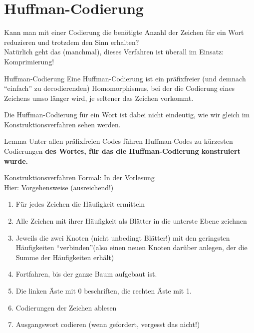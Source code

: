 \section{Huffman-Codierung}

\begin{frame}
	Kann man mit einer Codierung die benötigte Anzahl der Zeichen für ein Wort reduzieren und trotzdem den Sinn erhalten?\\[0.5em]
	\pause
	Natürlich geht das (manchmal), dieses Verfahren ist überall im Einsatz:\\
	Komprimierung!
\end{frame}

\begin{frame}{Huffman-Codierung}
	Eine Huffman-Codierung ist ein präfixfreier (und demnach \enquote{einfach} zu decodierenden) Homomorphismus, bei der die Codierung eines Zeichens umso länger wird, je seltener das Zeichen vorkommt.
	
	Die Huffman-Codierung für ein Wort ist dabei nicht eindeutig, wie wir gleich im Konstruktionsverfahren sehen werden.
	
	\begin{block}{Lemma}
		Unter allen präfixfreien Codes führen Huffman-Codes zu kürzesten Codierungen
		\textbf{des Wortes, für das die Huffman-Codierung konstruiert wurde.}
	\end{block}
\end{frame}

\begin{frame}{Konstruktionsverfahren}
	Formal: In der Vorlesung\\
	Hier: Vorgehensweise (ausreichend!)
	\begin{enumerate}
		\item Für jedes Zeichen die Häufigkeit ermitteln
		\item Alle Zeichen mit ihrer Häufigkeit als Blätter in die unterste Ebene zeichnen
		\item Jeweils die zwei Knoten (nicht unbedingt Blätter!) mit den geringsten Häufigkeiten \enquote{verbinden}(also einen neuen Knoten darüber anlegen, der die Summe der Häufigkeiten erhält)
		\item Fortfahren, bis der ganze Baum aufgebaut ist.
		\item Die linken Äste mit 0 beschriften, die rechten Äste mit 1.
		\item Codierungen der Zeichen ablesen
		\item Ausgangswort codieren (wenn gefordert, vergesst das nicht!)
	\end{enumerate}
\end{frame}

